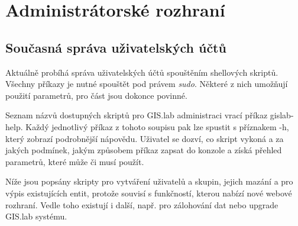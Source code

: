 \chapter{Administrátorské rozhraní}
\label{4-praxe}

\section{Současná správa uživatelských účtů}
\label{cmd-line}

Aktuálně probíhá správa uživatelských účtů spouštěním shellových
skriptů. Všechny příkazy je nutné spouštět pod právem
\textit{sudo}. Některé z nich umožňují použití parametrů, pro část
jsou dokonce povinné.

Seznam názvů dostupných skriptů pro GIS.lab administraci vrací příkaz
\textsf{gislab-help}. Každý jednotlivý příkaz z tohoto soupisu pak lze
spustit s příznakem \textsf{-h}, který zobrazí podrobnější
nápovědu. Uživatel se dozví, co skript vykoná a za jakých podmínek,
jakým způsobem příkaz zapsat do konzole a získá přehled parametrů,
které může či musí použít.

Níže jsou popsány skripty pro vytváření uživatelů a skupin, jejich
mazání a pro výpis existujících entit, protože souvisí s funkčností,
kterou nabízí nové webové rozhraní. Vedle toho existují i další,
např. pro zálohování dat nebo upgrade GIS.lab systému.


